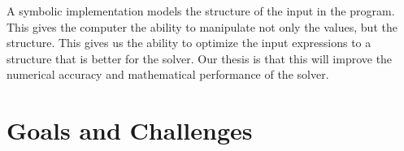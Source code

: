 \documentclass{scrartcl}
\begin{document}

A symbolic implementation models the structure of the input in the program.
This gives the computer the ability to manipulate not only the values, but the
structure. This gives us the ability to optimize the input expressions to
a structure that is better for the solver. Our thesis is that this will improve
the numerical accuracy and mathematical performance of the solver.









\section{Goals and Challenges}



\end{document}
